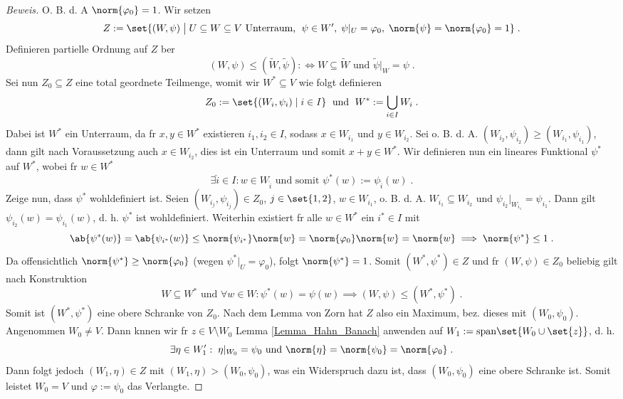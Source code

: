 \begin{proof}[Beweis]
	O. B. d. A \(\norm{\varphi_0} = 1\). Wir setzen
	\[Z := \set{(W,\psi)\;\big\vert\; U\subseteq W \subseteq V \text{ Unterraum, }\;\psi \in W',\; \psi\vert_U = \varphi_0,\; \norm{\psi} = \norm{\varphi_0} = 1}\;.\]
	Definieren partielle Ordnung auf $Z$ \us ber
	\[(W,\psi) \leq (\tilde W, \tilde \psi) : \iff W \subseteq \tilde W \text{ und } \tilde\psi \vert_W = \psi\;.\]
	Sei nun $Z_0\subseteq Z$ eine total geordnete Teilmenge, womit wir $W^*\subseteq V$ wie folgt definieren
	\[Z_0 := \set{(W_i,\psi_i)\;\vert\; i \in I}\;\text{ und }\; W^* := \bigcup_{i\in I} W_i\;.\]
	Dabei ist $W^*$ ein Unterraum, da f\us r \(x,y \in W^*\) existieren \(i_1, i_2 \in I\), sodass \(x \in W_{i_1}\) und \(y\in W_{i_2}\). Sei o. B. d. A. \((W_{i_2}, \psi_{i_2}) \geq (W_{i_1}, \psi_{i_1})\), dann gilt nach Voraussetzung auch \(x\in W_{i_2}\), dies ist ein Unterraum und somit \(x+y \in W^*\). Wir definieren nun ein lineares Funktional \(\psi^*\) auf \(W^*\), wobei f\us r \(w \in W^*\)
	\[ \exists \hat i\in I: w \in W_{\hat i} \text{ und somit }\psi^*(w) := \psi_{\hat i}(w)\;.\]
	Zeige nun, dass \(\psi^*\) wohldefiniert ist. Seien \((W_{i_j}, \psi_{i_j})\in Z_0\), \(j\in\set{1,2}\), \(w\in W_{i_1}\), o. B. d. A. \(W_{i_1}\subseteq W_{i_2}\) und \(\psi_{i_2}\vert_{W_{i_1}} = \psi_{i_1}\). Dann gilt \(\psi_{i_2}(w) = \psi_{i_1}(w)\), d. h. 
	\(\psi^*\) ist wohldefiniert. Weiterhin existiert f\us r alle \(w\in W^*\) ein \(i^* \in I \) mit 
	\[\ab{\psi^*(w)} = \ab{\psi_{i^*}(w)} \leq \norm{\psi_{i^*}}\norm{w} = \norm{\varphi_0} \norm{w} = \norm{w} \implies \norm{\psi^*} \leq 1\;.\]
	Da offensichtlich \(\norm{\psi^*} \geq \norm{\varphi_0}\) (wegen \(\psi^*\vert_U = \varphi_0\)), folgt \(\norm{\psi^*} = 1\).
	Somit \((W^*, \psi^*)\in Z\) und f\us r \((W,\psi) \in Z_0\) beliebig gilt nach Konstruktion 
	\[W \subseteq W^* \text{ und } \forall w \in W: \psi^*(w) = \psi(w) \implies (W,\psi) \leq (W^*, \psi^*)\;.\]
	Somit ist \((W^*, \psi^*)\) eine obere Schranke von $Z_0$. Nach dem Lemma von Zorn hat $Z$ also ein Maximum, bez. dieses mit \((W_0,\psi_0)\). Angenommen \(W_0 \neq V\). Dann k\os nnen wir f\us r \(z \in V \setminus W_0\) Lemma \ref{Lemma_Hahn_Banach} anwenden auf \(W_1:= \text{span}\set{W_0\cup\set{z}}\), d. h.
	\[\exists \eta \in W_1' :\; \eta\vert_{W_0} = \psi_0 \text{ und } \norm{\eta} = \norm{\psi_0} = \norm{\varphi_0}\;.\]
	Dann folgt jedoch \((W_1,\eta) \in Z\) mit \((W_1,\eta) > (W_0,\psi_0)\), was ein Widerspruch dazu ist, dass \((W_0, \psi_0)\) eine obere Schranke ist. Somit leistet \(W_0 = V\) und \(\varphi:= \psi_0\) das Verlangte.
\end{proof}
	
